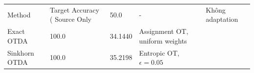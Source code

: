 \begin{tabular}{llll}
\toprule
Method & Target Accuracy (%
\midrule
Source Only & 50.0 & - & Không adaptation \\
Exact OTDA & 100.0 & 34.1440 & Assignment OT, uniform weights \\
Sinkhorn OTDA & 100.0 & 35.2198 & Entropic OT, $\epsilon = 0.05$ \\
\bottomrule
\end{tabular}
